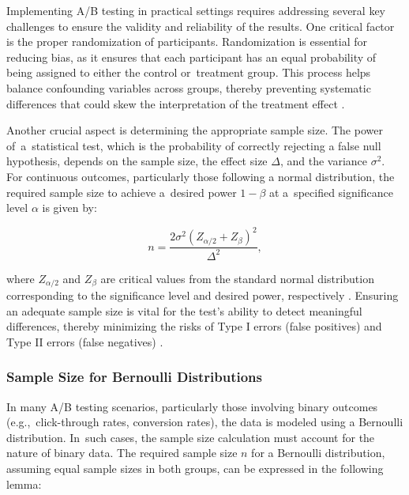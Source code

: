 \documentclass[magisterska, english]{pwr_wmat_praca_dyplomowa}
\theoremstyle{plain}
\numberwithin{theorem}{chapter}
\theoremstyle{definition}
\numberwithin{theorem}{chapter}
\begin{document}
Implementing A/B testing in practical settings requires addressing several key challenges to ensure the validity and reliability of the results. One critical factor is the proper randomization of participants. Randomization is essential for reducing bias, as it ensures that each participant has an equal probability of being assigned to either the control or~treatment group. This process helps balance confounding variables across groups, thereby preventing systematic differences that could skew the interpretation of the treatment effect \cite{Kohavi2013}.

Another crucial aspect is determining the appropriate sample size. The power of~a~statistical test, which is the probability of correctly rejecting a false null hypothesis, depends on the sample size, the effect size \( \Delta \), and the variance \( \sigma^2 \). For continuous outcomes, particularly those following a normal distribution, the required sample size to achieve a~desired power \( 1-\beta \) at a~specified significance level \( \alpha \) is given by:

\begin{equation*}
	n = \frac{2\sigma^2(Z_{\alpha/2} + Z_\beta)^2}{\Delta^2},
\end{equation*}

where \( Z_{\alpha/2} \) and \( Z_\beta \) are critical values from the standard normal distribution corresponding to the significance level and desired power, respectively \cite{cohen2013}. Ensuring an adequate sample size is vital for the test's ability to detect meaningful differences, thereby minimizing the risks of Type I errors (false positives) and Type II errors (false negatives) \cite{sullivan2012}.

\subsubsection{Sample Size for Bernoulli Distributions}

In many A/B testing scenarios, particularly those involving binary outcomes (e.g.,~click-through rates, conversion rates), the data is modeled using a Bernoulli distribution. In~such cases, the sample size calculation must account for the nature of binary data. The required sample size \( n \) for a Bernoulli distribution, assuming equal sample sizes in both groups, can be expressed in the following lemma:
\end{document}
